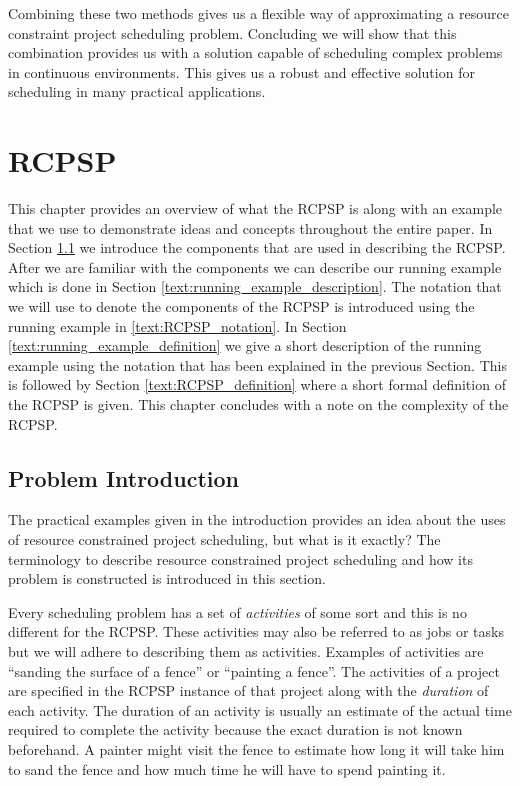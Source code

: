 \documentclass{article}
\theoremstyle{definition}
\begin{document}
Combining these two methods gives us a flexible way of approximating a resource constraint project scheduling problem.
Concluding we will show that this combination provides us with a solution capable of scheduling complex problems in continuous environments.
This gives us a robust and effective solution for scheduling in many practical applications.

\newpage

\section{RCPSP}
\label{text:RCPSP}

This chapter provides an overview of what the RCPSP is along with an example that we use to demonstrate ideas and concepts throughout the entire paper. 
In Section \ref{text:RCPSP_description} we introduce the components that are used in describing the RCPSP. 
After we are familiar with the components we can describe our running example which is done in Section \ref{text:running_example_description}. 
The notation that we will use to denote the components of the RCPSP is introduced using the running example in \ref{text:RCPSP_notation}. 
In Section \ref{text:running_example_definition} we give a short description of the running example using the notation that has been explained in the previous Section. 
This is followed by Section \ref{text:RCPSP_definition} where a short formal definition of the RCPSP is given. 
This chapter concludes with a note on the complexity of the RCPSP. 

\subsection{Problem Introduction}
\label{text:RCPSP_description}
The practical examples given in the introduction provides an idea about the uses of resource constrained project scheduling, but what is it exactly?
The terminology to describe resource constrained project scheduling and how its problem is constructed is introduced in this section.

Every scheduling problem has a set of \emph{activities} of some sort and this is no different for the RCPSP. 
These activities may also be referred to as jobs or tasks but we will adhere to describing them as activities. 
Examples of activities are ``sanding the surface of a fence'' or ``painting a fence''. 
The activities of a project are specified in the RCPSP instance of that project along with the \emph{duration} of each activity. 
The duration of an activity is usually an estimate of the actual time required to complete the activity because the exact duration is not known beforehand. 
A painter might visit the fence to estimate how long it will take him to sand the fence and how much time he will have to spend painting it. 
\end{document}
